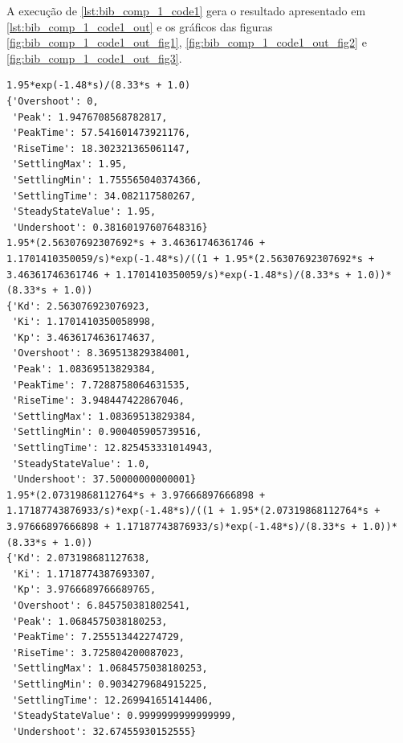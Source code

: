 A execução de \ref{lst:bib_comp_1_code1} gera o resultado apresentado em \ref{lst:bib_comp_1_code1_out}
e os gráficos das figuras \ref{fig:bib_comp_1_code1_out_fig1}, \ref{fig:bib_comp_1_code1_out_fig2} e
\ref{fig:bib_comp_1_code1_out_fig3}.

\begin{lstlisting}[label={lst:bib_comp_1_code1_out}]
1.95*exp(-1.48*s)/(8.33*s + 1.0)
{'Overshoot': 0,
 'Peak': 1.9476708568782817,
 'PeakTime': 57.541601473921176,
 'RiseTime': 18.302321365061147,
 'SettlingMax': 1.95,
 'SettlingMin': 1.755565040374366,
 'SettlingTime': 34.082117580267,
 'SteadyStateValue': 1.95,
 'Undershoot': 0.38160197607648316}
1.95*(2.56307692307692*s + 3.46361746361746 + 1.1701410350059/s)*exp(-1.48*s)/((1 + 1.95*(2.56307692307692*s + 3.46361746361746 + 1.1701410350059/s)*exp(-1.48*s)/(8.33*s + 1.0))*(8.33*s + 1.0))
{'Kd': 2.563076923076923,
 'Ki': 1.1701410350058998,
 'Kp': 3.4636174636174637,
 'Overshoot': 8.369513829384001,
 'Peak': 1.08369513829384,
 'PeakTime': 7.7288758064631535,
 'RiseTime': 3.948447422867046,
 'SettlingMax': 1.08369513829384,
 'SettlingMin': 0.900405905739516,
 'SettlingTime': 12.825453331014943,
 'SteadyStateValue': 1.0,
 'Undershoot': 37.50000000000001}
1.95*(2.07319868112764*s + 3.97666897666898 + 1.17187743876933/s)*exp(-1.48*s)/((1 + 1.95*(2.07319868112764*s + 3.97666897666898 + 1.17187743876933/s)*exp(-1.48*s)/(8.33*s + 1.0))*(8.33*s + 1.0))
{'Kd': 2.073198681127638,
 'Ki': 1.1718774387693307,
 'Kp': 3.9766689766689765,
 'Overshoot': 6.845750381802541,
 'Peak': 1.0684575038180253,
 'PeakTime': 7.255513442274729,
 'RiseTime': 3.725804200087023,
 'SettlingMax': 1.0684575038180253,
 'SettlingMin': 0.9034279684915225,
 'SettlingTime': 12.269941651414406,
 'SteadyStateValue': 0.9999999999999999,
 'Undershoot': 32.67455930152555}
\end{lstlisting}



